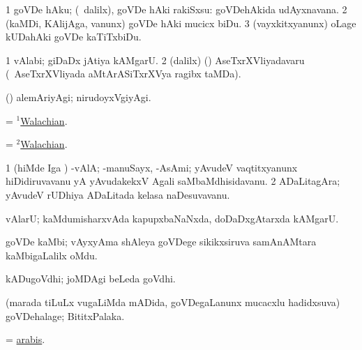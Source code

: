 \bentry
{}
\gl{\sakirx}
\expl{}
\bmng
\bnum
\num{1} goVDe hAku; (\kanmu\ \BUkaq dalilx), goVDe hAki rakiSxsu:  goVDehAkida udAyxnavana. 
\num{2} (kaMDi, KAlijAga, \mo vanunx) goVDe hAki mucicx biDu.
\num{3} (vayxkitxyanunx) oLage kUDahAki goVDe kaTiTxbiDu. 
\enum
\emng
\eentry

{} 
\gl{\nA}
\bmng
\bnum
\num{1} vAlabi; giDaDx jAtiya kAMgarU.  
\num{2}  (\bava dalilx) (\AmA) AseTxrXVliyadavaru (\kanmu\ AseTxrXVliyada aMtArASiTxrXVya ragibx taMDa). 
\enum
\emng

\noindent 
\gl{\pagu}
\expl{}
\bmng
{} (\AseTxrXV) alemAriyAgi; nirudoyxVgiyAgi. 
\emng
\eentry

\bentry
{} 
\gl{\gu}
\expl{}
\bmng
= \hyperlink{Walachian(1)}{$^1$Walachian}. 
\emng
\eentry

\bentry
{} 
\gl{\nA}
\bmng
= \hyperlink{Walachian(2)}{$^2$Walachian}. 
\emng
\eentry

\bentry
{} 
\gl{\nA}
\bmng
\bnum
\num{1} (hiMde \AMiM Iga \ashi) -vAlA; -manuSayx, -AsAmi; yAvudeV vaqtitxyanunx hiDidiruvavanu yA yAvudakekxV Agali saMbaMdhisidavanu. 
\num{2} ADaLitagAra; yAvudeV rUDhiya ADaLitada kelasa naDesuvavanu. 
\enum
\emng
\eentry

\bentry
{} 
\gl{\nA}
\bmng
vAlarU; kaMdumisharxvAda kapupxbaNaNxda, doDaDxgAtarxda kAMgarU. 
\emng
\eentry

\bentry
{} 
\gl{\nA}
\expl{}
\bmng
goVDe kaMbi; vAyxyAma shAleya goVDege sikikxsiruva samAnAMtara kaMbigaLalilx oMdu. 
\emng
\eentry

\bentry
{} 
\gl{\nA}
\expl{}
\bmng
kADugoVdhi; joMDAgi beLeda goVdhi. 
\emng
\eentry

\bentry
{} 
\gl{\nA}
\expl{}
\bmng
(marada tiLuLx \mo vugaLiMda mADida, goVDegaLanunx mucacxlu hadidxsuva) goVDehalage; BititxPalaka. 
\emng
\eentry

\bentry
{} 
\gl{\nA}
\expl{}
\bmng
= \hyperref{kandict_a.pdf}{A}{arabis}{arabis}. 
\emng
\eentry

